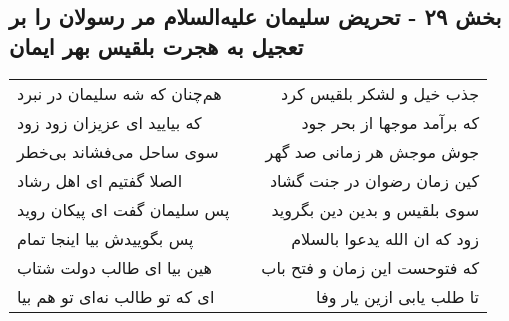 \begin{center}
\section*{بخش ۲۹ - تحریض سلیمان علیه‌السلام مر رسولان  را بر تعجیل به هجرت  بلقیس بهر ایمان}
\label{sec:sh029}
\begin{longtable}{l p{0.5cm} r}
هم‌چنان که شه سلیمان در نبرد
&&
جذب خیل و لشکر بلقیس کرد
\\
که بیایید ای عزیزان زود زود
&&
که برآمد موجها از بحر جود
\\
سوی ساحل می‌فشاند بی‌خطر
&&
جوش موجش هر زمانی صد گهر
\\
الصلا گفتیم ای اهل رشاد
&&
کین زمان رضوان در جنت گشاد
\\
پس سلیمان گفت ای پیکان روید
&&
سوی بلقیس و بدین دین بگروید
\\
پس بگوییدش بیا اینجا تمام
&&
زود که ان الله یدعوا بالسلام
\\
هین بیا ای طالب دولت شتاب
&&
که فتوحست این زمان و فتح باب
\\
ای که تو طالب نه‌ای تو هم بیا
&&
تا طلب یابی ازین یار وفا
\\
\end{longtable}
\end{center}
